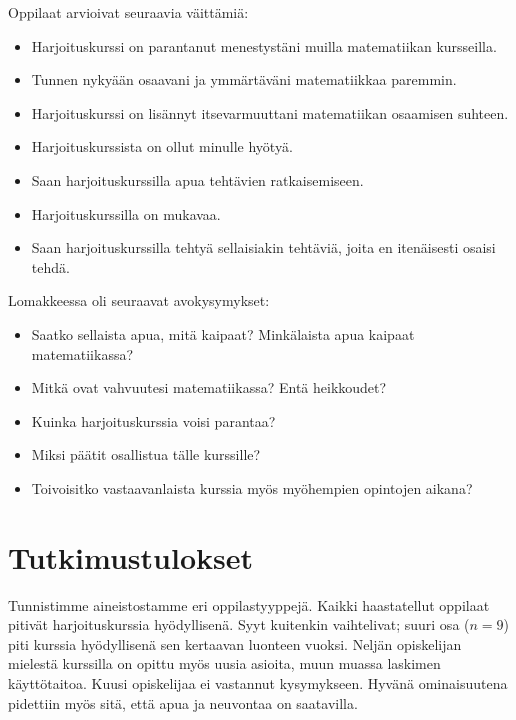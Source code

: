 \documentclass[a4paper,12pt,leqno,titlepage]{article}
\begin{document}
Oppilaat arvioivat seuraavia väittämiä:
\begin{itemize}
\item Harjoituskurssi on parantanut menestystäni muilla matematiikan kursseilla.
\item Tunnen nykyään osaavani ja ymmärtäväni matematiikkaa paremmin.
\item Harjoituskurssi on lisännyt itsevarmuuttani matematiikan osaamisen suhteen.
\item Harjoituskurssista on ollut minulle hyötyä.
\item Saan harjoituskurssilla apua tehtävien ratkaisemiseen.
\item Harjoituskurssilla on mukavaa.
\item Saan harjoituskurssilla tehtyä sellaisiakin tehtäviä, joita en itenäisesti osaisi tehdä.
\end{itemize}
Lomakkeessa oli seuraavat avokysymykset:
\begin{itemize}
\item Saatko sellaista apua, mitä kaipaat? Minkälaista apua kaipaat matematiikassa?
\item Mitkä ovat vahvuutesi matematiikassa? Entä heikkoudet?
\item Kuinka harjoituskurssia voisi parantaa?
\item Miksi päätit osallistua tälle kurssille?
\item Toivoisitko vastaavanlaista kurssia myös myöhempien opintojen aikana?
\end{itemize}
\begin{comment}
Haastattelimme myös harjoituskurssin opettajaa.
\textbf{Tämä pitäisi vielä tehdä..}
\begin{itemize}
\item Miten autat oppilasta löytämään ratkaisun?
\item Millainen on tyypillinen laskupajan asiakas?
\item Onko laskupaja yleensä ollut suosittu?
\item Minkälaisille opiskelijoille laskupaja on suunnattu?
\item Kuinka hyödylliseksi koet laskupajan?
\end{itemize}
\end{comment}
\section{Tutkimustulokset}
Tunnistimme aineistostamme eri oppilastyyppejä.
Kaikki haastatellut oppilaat pitivät harjoituskurssia hyödyllisenä.
Syyt kuitenkin vaihtelivat; suuri osa ($n=9$) piti kurssia hyödyllisenä sen kertaavan luonteen vuoksi.
Neljän opiskelijan mielestä kurssilla on opittu myös uusia asioita, muun muassa laskimen käyttötaitoa.
Kuusi opiskelijaa ei vastannut kysymykseen.
Hyvänä ominaisuutena pidettiin myös sitä, että apua ja neuvontaa on saatavilla.
\end{document}
